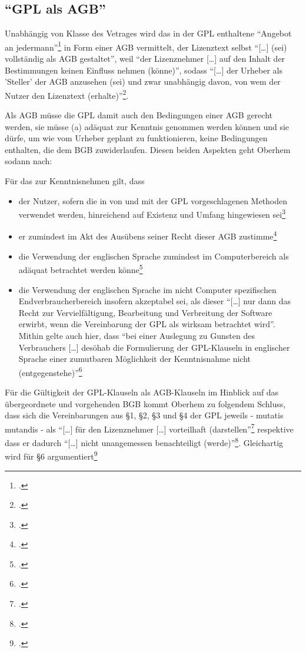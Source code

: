 \documentclass[DIV=calc,BCOR=5mm,11pt,headings=small,oneside,abstract=true, toc=bib]{scrartcl}
\begin{document}
\subsection{\enquote{GPL als AGB}}

Unabhängig von Klasse des Vetrages wird das in der GPL enthaltene
\enquote{Angebot an jedermann}\footcite[vgl.][104]{Oberhem2008a} in Form
einer AGB vermittelt, der Lizenztext selbst \enquote{[\ldots] (sei)
vollständig als AGB gestaltet}, weil \enquote{der Lizenznehmer
[\ldots] auf den Inhalt der Bestimmungen keinen Einfluss nehmen (könne)},
sodass \enquote{[\ldots] der Urheber als 'Steller' der AGB anzusehen (sei)
und zwar unabhängig davon, von wem der Nutzer den Lizenztext
(erhalte)}\footcite[vgl.][133]{Oberhem2008a}.

Als AGB müsse die GPL damit auch den Bedingungen einer AGB gerecht werden, sie
müsse (a) adäquat zur Kenntnis genommen werden können und sie dürfe, um wie vom
Urheber geplant zu funktionieren, keine Bedingungen enthalten, die dem BGB
zuwiderlaufen. Diesen beiden Aspekten geht Oberhem sodann nach:

Für das zur Kenntnisnehmen gilt, dass
\begin{itemize}
  \item der Nutzer, sofern die in von und mit der GPL vorgeschlagenen Methoden
  verwendet werden, hinreichend auf Existenz und Umfang hingewiesen
  sei\footcite[vgl.][134]{Oberhem2008a}
  \item er zumindest im Akt des Ausübens seiner Recht dieser AGB
  zustimme\footcite[vgl.][135]{Oberhem2008a}
  \item die Verwendung der englischen Sprache zumindest im Computerbereich als
  adäquat betrachtet werden könne\footcite[vgl.][135]{Oberhem2008a}
  \item die Verwendung der englischen Sprache im nicht Computer
  spezifischen Endverbraucherbereich insofern akzeptabel sei, als dieser
  \enquote{[\ldots] nur dann das Recht zur Vervielfältigung, Bearbeitung
  und Verbreitung der Software erwirbt, wenn die Vereinbarung der GPL als
  wirksam betrachtet wird}. Mithin gelte auch hier, dass \enquote{bei
  einer Auslegung zu Gunsten des Verbrauchers [\ldots] desöhab die
  Formulierung der GPL-Klauseln in englischer Sprache einer zumutbaren
  Möglichkeit der Kenntnisnahme nicht
  (entgegenstehe)}\footcite[vgl.][136]{Oberhem2008a}
\end{itemize}

Für die Gültigkeit der GPL-Klauseln als AGB-Klauseln im Hinblick auf das
übergeordnete und vorgehenden BGB kommt Oberhem zu folgendem Schluss, dass
sich die Vereinbarungen aus §1, §2, §3 und §4 der GPL jeweils - mutatis mutandis
- als \enquote{[\ldots] für den Lizenznehmer [\ldots] vorteilhaft
(darstellen}\footcite[vgl.][144]{Oberhem2008a} respektive dass er dadurch
\enquote{[\ldots] nicht unangemessen benachteiligt
(werde)}\footcite[vgl.][145]{Oberhem2008a}. Gleichartig wird für §6
argumentiert\footcite[vgl.][148]{Oberhem2008a}
\end{document}
